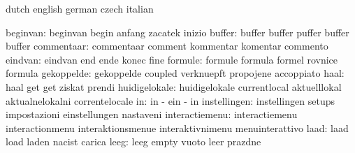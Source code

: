 \stopsetupvariables




\startelements             dutch                     english
                           german                    czech
                           italian

                 beginvan: beginvan                  begin
                           anfang                    zacatek
                           inizio
                   buffer: buffer                    buffer
                           puffer                    buffer
                           buffer
               commentaar: commentaar                comment
                           kommentar                 komentar
                           commento
                  eindvan: eindvan                   end
                           ende                      konec
                           fine
                  formule: formule                   formula
                           formel                    rovnice
                           formula
               gekoppelde: gekoppelde                coupled
                           verknuepft                propojene
                           accoppiato
                     haal: haal                      get
                           get                       ziskat
                           prendi
            huidigelokale: huidigelokale             currentlocal
                           aktuelllokal              aktualnelokalni
                           correntelocale
                       in: in                        -
                           ein                       -
                           in
             instellingen: instellingen              setups
                           impostazioni              einstellungen
                           nastaveni
           interactiemenu: interactiemenu            interactionmenu
                           interaktionsmenue         interaktivnimenu
                           menuinterattivo
                     laad: laad                      load
                           laden                     nacist
                           carica
                     leeg: leeg                      empty
                           vuoto                     leer
                           prazdne
